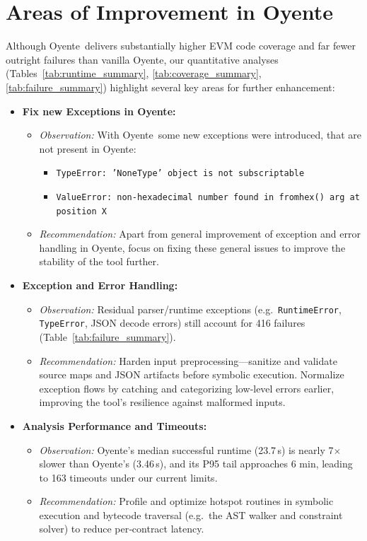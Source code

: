 \documentclass{article}
\newcommand\OY{Oyente}
\newcommand\OYp{\OY\raisebox{0.3ex}{\smaller +}}
\begin{document}
	\newpage
	\clearpage

	\section{Areas of Improvement in \OYp}
	Although \OYp\ delivers substantially higher EVM code coverage and far fewer outright failures than vanilla \OY, our quantitative analyses (Tables~\ref{tab:runtime_summary}, \ref{tab:coverage_summary}, \ref{tab:failure_summary}) highlight several key areas for further enhancement:

	\begin{itemize}
		\item \textbf{Fix new Exceptions in \OYp:}
		\begin{itemize}
			\item \emph{Observation:} With \OYp\ some new exceptions were introduced, that are not present in \OY:
			\begin{itemize}
				\item \texttt{TypeError: 'NoneType' object is not subscriptable}
				\item \texttt{ValueError: non-hexadecimal number found in fromhex() arg at position X}
			\end{itemize}
			\item \emph{Recommendation:} Apart from general improvement of exception and error handling in \OYp, focus on fixing these general issues to improve the stability of the tool further.
		\end{itemize}

		\item \textbf{Exception and Error Handling:} \begin{itemize}
			\item \emph{Observation:} Residual parser/runtime exceptions (e.g.\ \texttt{RuntimeError}, \texttt{TypeError}, JSON decode errors) still account for 416 failures (Table~\ref{tab:failure_summary}).
			\item \emph{Recommendation:} Harden input preprocessing—sanitize and validate source maps and JSON artifacts before symbolic execution. Normalize exception flows by catching and categorizing low‐level errors earlier, improving the tool’s resilience against malformed inputs.
		\end{itemize}

		\item \textbf{Analysis Performance and Timeouts:}
		\begin{itemize}
			\item \emph{Observation:} \OYp’s median successful runtime (23.7\,s) is nearly 7$\times$ slower than \OY’s (3.46\,s), and its P95 tail approaches 6 min, leading to 163 timeouts under our current limits.
			\item \emph{Recommendation:} Profile and optimize hotspot routines in symbolic execution and bytecode traversal (e.g.\ the AST walker and constraint solver) to reduce per‐contract latency.
		\end{itemize}


\end{itemize}
\end{document}
